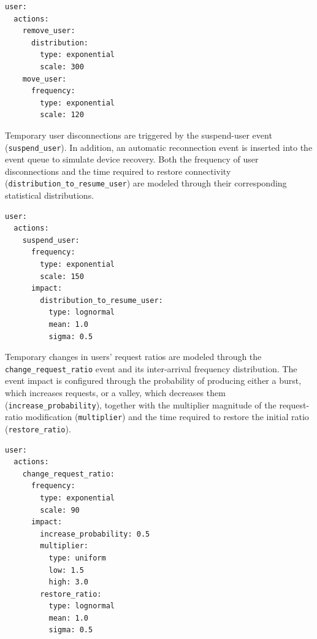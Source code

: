 \documentclass[ASNA]{USG} %
\begin{document}
\begin{lstlisting}[caption={YAML configuration for basic user events.},label=lst:user_event, basicstyle=\fontsize{8}{10}\selectfont\ttfamily]
user:
  actions:
    remove_user:
      distribution:
        type: exponential
        scale: 300
    move_user:
      frequency:
        type: exponential
        scale: 120
\end{lstlisting}


Temporary user disconnections are triggered by the suspend-user event (\texttt{suspend\_user}). In addition, an automatic reconnection event is inserted into the event queue to simulate device recovery. Both the frequency of user disconnections and the time required to restore connectivity (\texttt{distribution\_to\_resume\_user}) are modeled through their corresponding statistical distributions.

\begin{lstlisting}[caption={YAML configuration for user disconection event.},label=lst:user_event, basicstyle=\fontsize{8}{10}\selectfont\ttfamily]
user:
  actions:
    suspend_user:
      frequency:
        type: exponential
        scale: 150
      impact:
        distribution_to_resume_user:
          type: lognormal
          mean: 1.0
          sigma: 0.5
\end{lstlisting}

Temporary changes in users' request ratios are modeled through the \texttt{change\_request\_ratio} event and its inter-arrival frequency distribution. The event impact is configured through the probability of producing either a burst, which increases requests, or a valley, which decreases them (\texttt{increase\_probability}), together with the multiplier magnitude of the request-ratio modification (\texttt{multiplier}) and the time required to restore the initial ratio (\texttt{restore\_ratio}).

\begin{lstlisting}[caption={YAML configuration for activity changes user event.},label=lst:user_event, basicstyle=\fontsize{8}{10}\selectfont\ttfamily]
user:
  actions:
    change_request_ratio:
      frequency:
        type: exponential
        scale: 90
      impact:
        increase_probability: 0.5
        multiplier:
          type: uniform
          low: 1.5
          high: 3.0
        restore_ratio:
          type: lognormal
          mean: 1.0
          sigma: 0.5
\end{lstlisting}

\label{anex:applicationdefinition}
\end{document}
